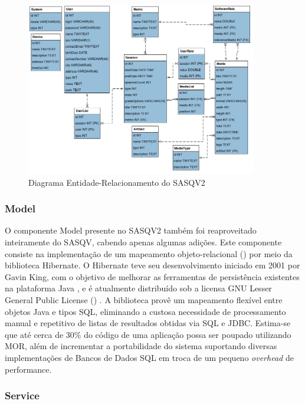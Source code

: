 \begin{figure}[!htb]
	\centering
	\includegraphics[width=0.9\textwidth]{./imgs/diagramaER.png}
	\caption{Diagrama Entidade-Relacionamento do SASQV2}
	\label{fig:diagramaER}
\end{figure}

\subsubsection{Model}

O componente Model presente no SASQV2 também foi reaproveitado inteiramente do SASQV, cabendo apenas algumas adições. Este componente consiste na implementação de um mapeamento objeto-relacional () por meio da biblioteca Hibernate. 
O Hibernate teve seu desenvolvimento iniciado em 2001 por Gavin King, com o objetivo de melhorar as ferramentas de persistência existentes na plataforma Java \cite{hibernateHistory}, e é atualmente distribuído sob a licensa GNU Lesser General Public License () \cite{hibernateAbout}.
A biblioteca provê um mapeamento flexível entre objetos Java e tipos SQL, eliminando a custosa necessidade de processamento manual e repetitivo de listas de resultados obtidas via SQL e JDBC.
Estima-se que até cerca de 30\% do código de uma aplicação possa ser poupado utilizando MOR, além de incrementar a portabilidade do sistema suportando diversas implementações de Bancos de Dados SQL em troca de um pequeno \emph{overhead} de performance.

\subsubsection{Service}
